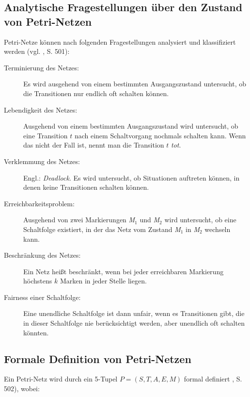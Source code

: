 \subsection{Analytische Fragestellungen über den Zustand von Petri-Netzen}
Petri-Netze können nach folgenden Fragestellungen analysiert und klassifiziert werden (vgl. \citep{ClausSchwill2006}, S. 501):

\begin{description}
\item[Terminierung des Netzes:] Es wird ausgehend von einem bestimmten Ausgangszustand untersucht, ob die Transitionen nur endlich oft schalten können.
\item[Lebendigkeit des Netzes:] Ausgehend von einem bestimmten Ausgangszustand wird untersucht, ob eine Transition $t$ nach einem Schaltvorgang nochmals schalten kann. Wenn das nicht der Fall ist, nennt man die Transition $t$ \emph{tot}.
\item[Verklemmung des Netzes:] Engl.: \emph{Deadlock}. Es wird untersucht, ob Situationen auftreten können, in denen keine Transitionen schalten können.
\item[Erreichbarkeitsproblem:] Ausgehend von zwei Markierungen \emph{M$_{1}$} und \emph{M$_{2}$} wird untersucht, ob eine Schaltfolge existiert, in der das Netz vom Zustand \emph{M$_{1}$} in \emph{M$_{2}$} wechseln kann.
\item[Beschränkung des Netzes:] Ein Netz heißt beschränkt, wenn bei jeder erreichbaren Markierung höchstens $k$ Marken in jeder Stelle liegen.
\item[Fairness einer Schaltfolge:] Eine unendliche Schaltfolge ist dann unfair, wenn es Transitionen gibt, die in dieser Schaltfolge nie berücksichtigt werden, aber unendlich oft schalten könnten.
\end{description}


\subsection{Formale Definition von Petri-Netzen}
Ein Petri-Netz wird durch ein 5-Tupel $P=(S,T,A,E,M)$ formal definiert \citep{ClausSchwill2006}, S. 502), wobei:

